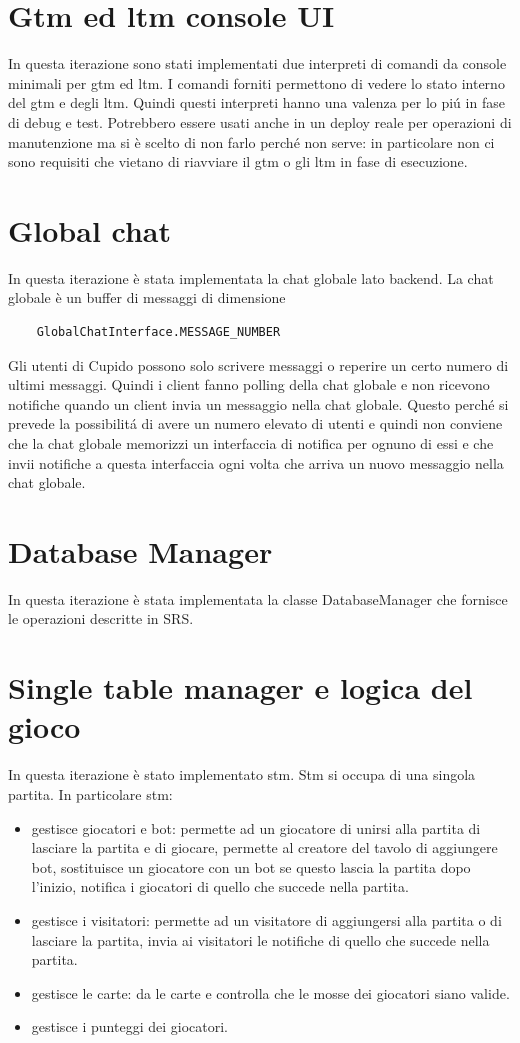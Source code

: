 \section{Gtm ed ltm console UI}
  In questa iterazione sono stati implementati due interpreti di comandi da console minimali per gtm ed ltm. I comandi forniti permettono di vedere lo stato interno del gtm e degli ltm. Quindi questi interpreti hanno una valenza per lo pi\'u in fase di debug e test. Potrebbero essere usati anche in un deploy reale per operazioni di manutenzione ma si \`e scelto di non farlo perch\'e non serve: in particolare non ci sono requisiti che vietano di riavviare il gtm o gli ltm in fase di esecuzione.

\section{Global chat}
  In questa iterazione \`e stata implementata la chat globale lato backend. La chat globale \`e un buffer di messaggi di dimensione 
  \begin{verbatim}
    GlobalChatInterface.MESSAGE_NUMBER
  \end{verbatim}
  Gli utenti di Cupido possono solo scrivere messaggi o reperire un certo numero di ultimi messaggi. Quindi i client fanno polling della chat globale e non ricevono notifiche quando un client invia un messaggio nella chat globale. Questo perch\'e si prevede la possibilit\'a di avere un numero elevato di utenti e quindi non conviene che la chat globale memorizzi un interfaccia di notifica per ognuno di essi e che invii notifiche a questa interfaccia ogni volta che arriva un nuovo messaggio nella chat globale.

\section{Database Manager}
  In questa iterazione \`e stata implementata la classe DatabaseManager che fornisce le operazioni descritte in SRS.


\section{Single table manager e logica del gioco}
  In questa iterazione \`e stato implementato stm. Stm si occupa di una singola partita. In particolare stm:
  \begin{itemize}
    \item 
      gestisce giocatori e bot: permette ad un giocatore di unirsi alla partita  di lasciare la partita e di giocare, permette al creatore del tavolo di aggiungere bot, sostituisce un giocatore con un bot se questo lascia la partita dopo l'inizio, notifica i giocatori di quello che succede nella partita.
    \item
      gestisce i visitatori: permette ad un visitatore di aggiungersi alla partita o di lasciare la partita, invia ai visitatori le notifiche di quello che succede nella partita.
    \item
      gestisce le carte: da le carte e controlla che le mosse dei giocatori siano valide.
    \item
      gestisce i punteggi dei giocatori.
  \end{itemize}
  

